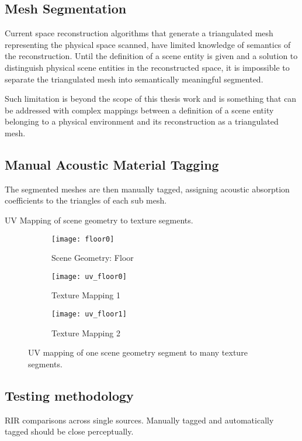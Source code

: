 \subsection{Mesh Segmentation}
Current space reconstruction algorithms that generate a triangulated mesh representing the physical space scanned, have limited knowledge of semantics of the reconstruction. Until the definition of a scene entity is given and a solution to distinguish physical scene entities in the reconstructed space, it is impossible to separate the triangulated mesh into semantically meaningful segmented.\par
Such limitation is beyond the scope of this thesis work and is something that can be addressed with complex mappings between a definition of a scene entity belonging to a physical environment and its reconstruction as a triangulated mesh. 

\subsection{Manual Acoustic Material Tagging}
The segmented meshes are then manually tagged, assigning acoustic absorption coefficients to the triangles of each sub mesh.

UV Mapping of scene geometry to texture segments.

\begin{figure}
    \centering
    \begin{subfigure}{0.75\textwidth}
        \texttt{[image: floor0]}
        \caption{Scene Geometry: Floor}
        \label{fig:floor}
    \end{subfigure}
    \hfill
    \begin{subfigure}{0.42\textwidth}
        \texttt{[image: uv\_floor0]}
        \caption{Texture Mapping 1}
        \label{fig:uv_floor}
    \end{subfigure}
    \hfill
    \begin{subfigure}{0.42\textwidth}
        \texttt{[image: uv\_floor1]}
        \caption{Texture Mapping 2}
        \label{fig:uv_floor2}
    \end{subfigure}
            
    \caption{UV mapping of one scene geometry segment to many texture segments.}
    \label{fig:uv_mapping_demo}
\end{figure}


\subsection{Testing methodology}
RIR comparisons across single sources. Manually tagged and automatically tagged should be close perceptually.


